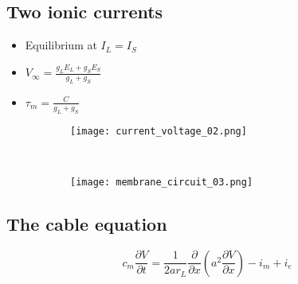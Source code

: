 \documentclass[main]{subfiles}
\begin{document}
\subsection{Two ionic currents}
\begin{itemize}[noitemsep,nolistsep]
	\item Equilibrium at $I_L=I_S$
	\item $V_\infty = \frac{g_LE_L+g_SE_S}{g_L+g_S}$
	\item $\tau_m = \frac{C}{g_L+g_S}$
\end{itemize}
\begin{figure}[H]
	\centering
	\begin{subfigure}[b]{0.4\textwidth}
		\centering
		\texttt{[image: current\_voltage\_02.png]}
	\end{subfigure}%
	~
	\begin{subfigure}[b]{0.4\textwidth}
		\centering
		\texttt{[image: membrane\_circuit\_03.png]}
	\end{subfigure}
\end{figure}

\subsection{The cable equation}
\[c_m\frac{\partial V}{\partial t} = \frac{1}{2ar_L}\frac{\partial}{\partial x}(a^2\frac{\partial V}{\partial x})-i_m+i_e\]
\begin{figure}[H]
	\centering
\end{figure}
\end{document}
